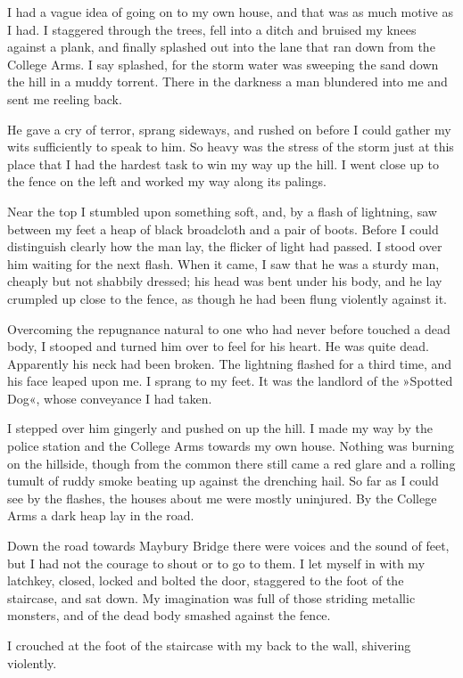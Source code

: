 

I had a vague idea of going on to my own house, and that was as much motive as I had. I staggered through the trees, fell into a ditch and bruised my knees against a plank, and finally splashed out into the lane that ran down from the College Arms. I say splashed, for the storm water was sweeping the sand down the hill in a muddy torrent. There in the darkness a man blundered into me and sent me reeling back.

He gave a cry of terror, sprang sideways, and rushed on before I could gather my wits sufficiently to speak to him. So heavy was the stress of the storm just at this place that I had the hardest task to win my way up the hill. I went close up to the fence on the left and worked my way along its palings.

Near the top I stumbled upon something soft, and, by a flash of lightning, saw between my feet a heap of black broadcloth and a pair of boots. Before I could distinguish clearly how the man lay, the flicker of light had passed. I stood over him waiting for the next flash. When it came, I saw that he was a sturdy man, cheaply but not shabbily dressed; his head was bent under his body, and he lay crumpled up close to the fence, as though he had been flung violently against it.

Overcoming the repugnance natural to one who had never before touched a dead body, I stooped and turned him over to feel for his heart. He was quite dead. Apparently his neck had been broken. The lightning flashed for a third time, and his face leaped upon me. I sprang to my feet. It was the landlord of the »Spotted Dog«, whose conveyance I had taken.

I stepped over him gingerly and pushed on up the hill. I made my way by the police station and the College Arms towards my own house. Nothing was burning on the hillside, though from the common there still came a red glare and a rolling tumult of ruddy smoke beating up against the drenching hail. So far as I could see by the flashes, the houses about me were mostly uninjured. By the College Arms a dark heap lay in the road.

Down the road towards Maybury Bridge there were voices and the sound of feet, but I had not the courage to shout or to go to them. I let myself in with my latchkey, closed, locked and bolted the door, staggered to the foot of the staircase, and sat down. My imagination was full of those striding metallic monsters, and of the dead body smashed against the fence.


I crouched at the foot of the staircase with my back to the wall, shivering violently.

